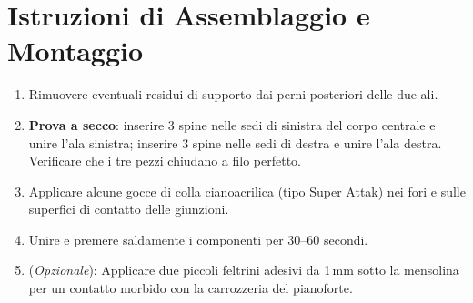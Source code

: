 \documentclass[11pt,a4paper]{article}
\begin{document}
\section{Istruzioni di Assemblaggio e Montaggio}
\begin{enumerate}
    \item Rimuovere eventuali residui di supporto dai perni posteriori delle due ali.
    \item \textbf{Prova a secco}: inserire 3 spine nelle sedi di sinistra del corpo centrale e unire l'ala sinistra; inserire 3 spine nelle sedi di destra e unire l'ala destra. Verificare che i tre pezzi chiudano a filo perfetto.
    \item Applicare alcune gocce di colla cianoacrilica (tipo Super Attak) nei fori e sulle superfici di contatto delle giunzioni.
    \item Unire e premere saldamente i componenti per 30--60 secondi.
    \item (\textit{Opzionale}): Applicare due piccoli feltrini adesivi da 1\,mm sotto la mensolina per un contatto morbido con la carrozzeria del pianoforte.
\end{enumerate}
\end{document}
